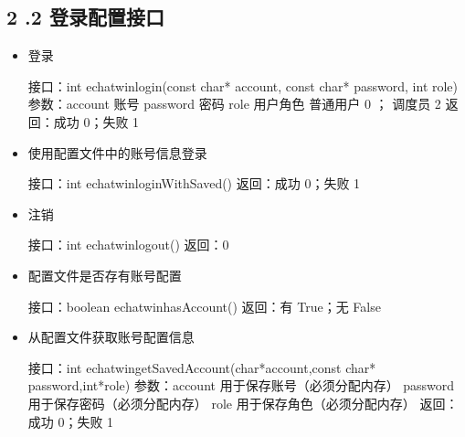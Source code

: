 \documentclass[letterpaper,10pt,english]{sphinxmanual}
\begin{document}
\subsection{2 .2 登录配置接口}
\label{\detokenize{c_win:id4}}\begin{itemize}
\item {} 
登录

%
\begin{sphinxVerbatim}[commandchars=\\\{\}]
接口：int echat\PYGZus{}win\PYGZus{}login(const char* account, const char* password, int role)
参数：account  账号
  password 密码
  role  用户角色 普通用户 0 ； 调度员 2
返回：成功 0；失败 \PYGZhy{}1
\end{sphinxVerbatim}

\item {} 
使用配置文件中的账号信息登录

%
\begin{sphinxVerbatim}[commandchars=\\\{\}]
接口：int echat\PYGZus{}win\PYGZus{}loginWithSaved()
返回：成功 0；失败 \PYGZhy{}1
\end{sphinxVerbatim}

\item {} 
注销

%
\begin{sphinxVerbatim}[commandchars=\\\{\}]
接口：int echat\PYGZus{}win\PYGZus{}logout()
返回：0
\end{sphinxVerbatim}

\item {} 
配置文件是否存有账号配置

%
\begin{sphinxVerbatim}[commandchars=\\\{\}]
接口：boolean echat\PYGZus{}win\PYGZus{}hasAccount()
返回：有 True；无 False
\end{sphinxVerbatim}

\item {} 
从配置文件获取账号配置信息

%
\begin{sphinxVerbatim}[commandchars=\\\{\}]
接口：int echat\PYGZus{}win\PYGZus{}getSavedAccount(char*account,const char* password,int*role)
参数：account  用于保存账号（必须分配内存）
  password  用于保存密码（必须分配内存）
  role  用于保存角色（必须分配内存）
返回：成功 0；失败 \PYGZhy{}1
\end{sphinxVerbatim}


\end{itemize}
\end{document}
